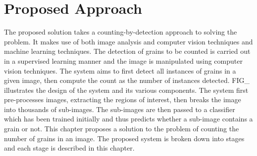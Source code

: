 


\def\baselinestretch{1}

\chapter{Proposed Approach}

\def\baselinestretch{1.66}



The proposed solution takes a counting-by-detection approach to solving the problem. It makes use of both image analysis and computer vision techniques and machine learning techniques. The detection of grains to be counted is carried out in a supervised learning manner and the image is manipulated using computer vision techniques. The system aims to first detect all instances of grains in a given image, then compute the count as the number of instances detected. FIG\_ illustrates the design of the system and its various components. The system first pre-processes images, extracting the regions of interest, then breaks the image into  thousands of sub-images. The sub-images are then passed to a classifier which has been trained initially and thus predicts whether a sub-image contains a grain or not. This chapter proposes a solution to the problem of counting the number of grains in an image. The proposed system is broken down into stages and each stage is described in this chapter.

\smallskip

